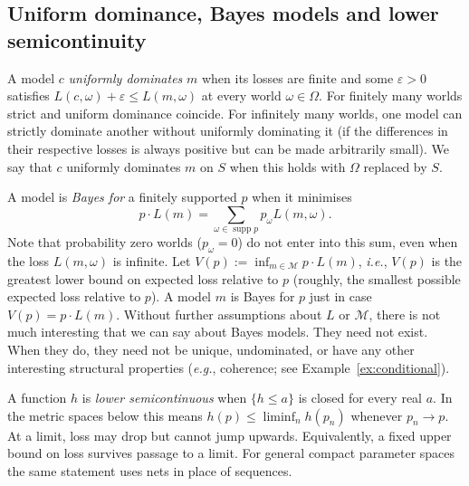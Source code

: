 \documentclass[11pt]{article}
\theoremstyle{definition}
\theoremstyle{remark}
\newcommand{\M}{\mathcal M}
\newcommand{\supp}{\operatorname{supp}}
\begin{document}
\subsection{Uniform dominance, Bayes models and lower semicontinuity}\label{sec:ordinal}
A model $c$ \emph{uniformly dominates} $m$ when its losses are finite and some $\varepsilon>0$ satisfies $L(c,\omega)+\varepsilon\le L(m,\omega)$ at every world $\omega\in\Omega$. For finitely many worlds strict and uniform dominance coincide. For infinitely many worlds, one model can strictly dominate another without uniformly dominating it (if the differences in their respective losses is always positive but can be made arbitrarily small). We say that $c$ uniformly dominates $m$ on $S$ when this holds with $\Omega$ replaced by $S$.

A model is \emph{Bayes for} a finitely supported $p$ when it minimises
\[
 p\cdot L(m)=\sum_{\omega\in\supp p}p_\omega L(m,\omega).
\]
Note that probability zero worlds ($p_\omega=0$) do not enter into this sum, even when the loss $L(m,\omega)$ is infinite. Let $V(p):=\inf_{m\in\M}p\cdot L(m)$, \textit{i.e.}, $V(p)$ is the greatest lower bound on expected loss relative to $p$ (roughly, the smallest possible expected loss relative to $p$). A model $m$ is Bayes for $p$ just in case $V(p)=p\cdot L(m)$. Without further assumptions about $L$ or $\M$, there is not much interesting that we can say about Bayes models. They need not exist. When they do, they need not be unique, undominated, or have any other interesting structural properties (\textit{e.g.}, coherence; see Example~\ref{ex:conditional}).

A function $h$ is \emph{lower semicontinuous} when $\{h\le a\}$ is closed for every real $a$. In the metric spaces below this means $h(p)\le\liminf_n h(p_n)$ whenever $p_n\to p$. At a limit, loss may drop but cannot jump upwards. Equivalently, a fixed upper bound on loss survives passage to a limit. For general compact parameter spaces the same statement uses nets in place of sequences.
\end{document}
